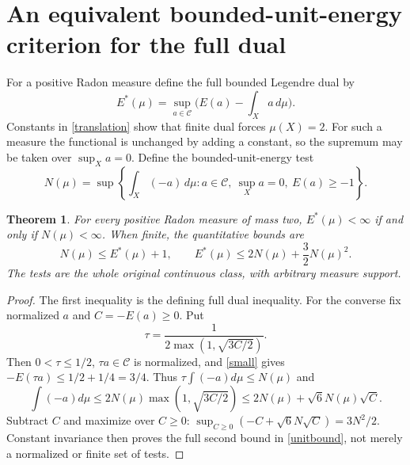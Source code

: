 \documentclass[11pt]{article}
\newtheorem{theorem}{Theorem}
\newcommand{\C}{\mathcal C}
\begin{document}
\section{An equivalent bounded-unit-energy criterion for the full dual}
For a positive Radon measure define the full bounded Legendre dual by
\[
 E^*(\mu)=\sup_{a\in\C}\bigl(E(a)-\int_Xa\,d\mu\bigr).
\]
Constants in \eqref{translation} show that finite dual forces
$\mu(X)=2$. For such a measure the functional is unchanged by adding
a constant, so the supremum may be taken over $\sup_Xa=0$.
Define the bounded-unit-energy test
\[
 N(\mu)=\sup\left\{\int_X(-a)\,d\mu:
       a\in\C,\ \sup_Xa=0,\ E(a)\ge-1\right\}.
\]
\begin{theorem}\label{unit}
For every positive Radon measure of mass two,
$E^*(\mu)<\infty$ if and only if $N(\mu)<\infty$.
When finite, the quantitative bounds are
\begin{equation}\label{unitbound}
 N(\mu)\le E^*(\mu)+1,
 \qquad E^*(\mu)\le2N(\mu)+\frac32N(\mu)^2.
\end{equation}
The tests are the whole original continuous class, with arbitrary
measure support.
\end{theorem}
\begin{proof}
The first inequality is the defining full dual inequality.
For the converse fix normalized $a$ and $C=-E(a)\ge0$. Put
\[
 \tau=\frac1{2\max(1,\sqrt{3C/2})}.
\]
Then $0<\tau\le1/2$, $\tau a\in\C$ is normalized, and
\eqref{small} gives $-E(\tau a)\le1/2+1/4=3/4$.
Thus $\tau\int(-a)d\mu\le N(\mu)$ and
\[
 \int(-a)d\mu\le 2N(\mu)\max(1,\sqrt{3C/2})
              \le 2N(\mu)+\sqrt6 N(\mu)\sqrt C.
\]
Subtract $C$ and maximize over $C\ge0$:
$\sup_{C\ge0}(-C+\sqrt6 N\sqrt C)=3N^2/2$.
Constant invariance then proves the full second bound in
\eqref{unitbound}, not merely a normalized or finite set of tests.
\end{proof}
\end{document}
